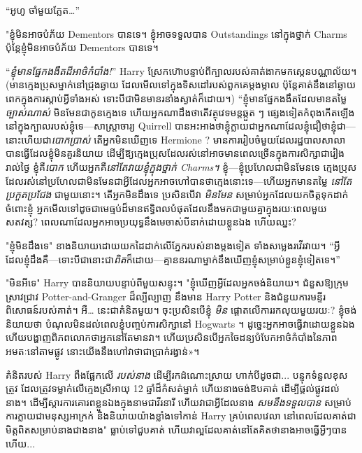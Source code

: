 {{{{{{“អូហូ ចាំមួយភ្លែត…”

"ខ្ញុំមិនអាចបំភ័យ Dementors បានទេ។ ខ្ញុំអាចទទួលបាន Outstandings នៅក្នុងថ្នាក់ Charms ប៉ុន្តែខ្ញុំមិនអាចបំភ័យ Dementors បានទេ។

“\emph{ខ្ញុំ​មាន​ផ្នែក​ងងឹត​ដ៏​អាថ៌កំបាំង!}” Harry ស្រែក​ហ៊ោ​បន្ទាប់​ពី​ក្បាល​របស់​គាត់​ងាក​មក​ស្កេន​បណ្ណាល័យ។ (មានក្មេងប្រុសម្នាក់នៅជ្រុងឆ្ងាយ ដែលមើលទៅក្នុងទិសដៅរបស់ពួកគេម្តងម្កាល ប៉ុន្តែគាត់នឹងនៅឆ្ងាយពេកក្នុងការស្តាប់អ្វីទាំងអស់ ទោះបីជាមិនមានរនាំងស្ងាត់ក៏ដោយ។) “ខ្ញុំមានផ្នែកងងឹតដែលមានតម្លៃ \emph{ ច្បាស់ណាស់} មិនមែនជាកូនក្មេងទេ ហើយអ្នកណាដឹងថាតើវត្ថុវេទមន្តឆ្កួត ៗ ផ្សេងទៀតកំពុងកើតឡើងនៅក្នុងក្បាលរបស់ខ្ញុំទេ—សាស្រ្តាចារ្យ Quirrell បានអះអាងថាខ្ញុំក្លាយជាអ្នកណាដែលខ្ញុំជឿថាខ្ញុំជា—នោះហើយជា\emph{បោកប្រាស់} តើអ្នកមិនឃើញទេ Hermione ? មានការរៀបចំមួយដែលរដ្ឋបាលសាលាបានធ្វើដែលខ្ញុំមិនគួរនិយាយ ដើម្បីឱ្យក្មេងប្រុសដែលរស់នៅអាចមានពេលច្រើនក្នុងការសិក្សាជារៀងរាល់ថ្ងៃ ខ្ញុំគឺ\emph{បោក} ហើយអ្នកគឺ\emph{នៅតែវាយខ្ញុំក្នុងថ្នាក់ Charms។} ខ្ញុំ—ខ្ញុំប្រហែលជាមិនមែនទេ ក្មេងប្រុសដែលរស់នៅប្រហែលជាមិនមែនជាអ្វីដែលអ្នកអាចហៅបានថាក្មេងនោះទេ—ហើយអ្នកមានតម្លៃ \emph{នៅតែប្រកួតប្រជែង } ជាមួយនោះ។ តើអ្នកមិនដឹងទេ ប្រសិនបើវា \emph{មិនមែន} សម្រាប់អ្នកដែលយកចិត្តទុកដាក់ចំពោះខ្ញុំ អ្នកមើលទៅដូចជាមេធ្មប់ដ៏មានឥទ្ធិពលបំផុតដែលនឹងមកជាមួយគ្នាក្នុងរយៈពេលមួយសតវត្ស? ពេល​ណា​ដែល​អ្នក​អាច​ប្រយុទ្ធ​នឹង​មេ​ចាស់​បី​នាក់​ដោយ​ខ្លួន​ឯង ហើយ​ឈ្នះ?

"ខ្ញុំមិនដឹងទេ" នាងនិយាយដោយយកដៃដាក់លើភ្នែករបស់នាងម្តងទៀត ទាំងសម្លេងរវើរវាយ។ “អ្វីដែលខ្ញុំដឹងគឺ—ទោះបីជានោះជា\emph{ពិត}ក៏ដោយ—គ្មាននរណាម្នាក់នឹងឃើញខ្ញុំសម្រាប់ខ្លួនខ្ញុំទៀតទេ។”

"មិនអីទេ" Harry បាននិយាយបន្ទាប់ពីមួយសន្ទុះ។ "ខ្ញុំឃើញអ្វីដែលអ្នកចង់និយាយ។ ជំនួសឱ្យក្រុមស្រាវជ្រាវ Potter-and-Granger ដ៏ល្បីល្បាញ នឹងមាន Harry Potter និងជំនួយការមន្ទីរពិសោធន៍របស់គាត់។ អឺ… នេះជាគំនិតមួយ។ ចុះប្រសិនបើខ្ញុំ \emph{មិន} ផ្តោតលើការរកលុយមួយរយៈ? ខ្ញុំចង់និយាយថា បំណុលមិនដល់ពេលខ្ញុំបញ្ចប់ការសិក្សានៅ Hogwarts ។ ដូច្នេះអ្នកអាចធ្វើវាដោយខ្លួនឯង ហើយបង្ហាញពិភពលោកថាអ្នកនៅតែមានវា។ ហើយ​ប្រសិន​បើ​អ្នក​ចៃដន្យ​បំបែក​អាថ៌កំបាំង​នៃ​ភាព​អមតៈ​នៅ​តាម​ផ្លូវ នោះ​យើង​នឹង​ហៅ​វា​ថា​ជា​ប្រាក់​រង្វាន់»។

គំនិតរបស់ Harry ពឹងផ្អែកលើ \emph{របស់នាង} ដើម្បីរកដំណោះស្រាយ ហាក់បីដូចជា... បន្ទុកទំនួលខុសត្រូវ ដែលត្រូវទម្លាក់លើក្មេងស្រីអាយុ 12 ឆ្នាំដ៏កំសត់ម្នាក់ ហើយនាងចង់ឱបគាត់ ដើម្បីផ្តល់ផ្លូវដល់នាង។ ដើម្បីស្តារការគោរពខ្លួនឯងក្នុងនាមជាវីរនារី ហើយវាជាអ្វីដែលនាង \emph{សមនឹងទទួលបាន} សម្រាប់ការក្លាយជាមនុស្សអាក្រក់ និងនិយាយយ៉ាងខ្លាំងទៅកាន់ Harry គ្រប់ពេលវេលា នៅពេលដែលគាត់ជាមិត្តពិតសម្រាប់នាងជាងនាង" ធ្លាប់ទៅជួបគាត់ ហើយវាល្អដែលគាត់នៅតែគិតថានាងអាចធ្វើអ្វីៗបាន ហើយ...

}}}}}}
